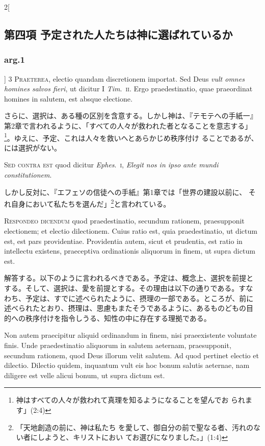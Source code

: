\documentclass[paper=a4paper,fontsize=10pt,jafontsize=9pt,titlepage]{jlreq}
\begin{document}
\begin{paracol}{2}[\subsection{第四項 予定された人たちは神に選ばれているか}\subsubsection{arg.1}]
{\scshape 3 Praeterea}, electio quandam discretionem
 importat. Sed Deus {\itshape vult omnes homines salvos fieri}, ut dicitur I
 {\itshape Tim}.~{\scshape ii}. Ergo praedestinatio, quae praeordinat homines in salutem, est
 absque electione.


\switchcolumn


さらに、選択は、ある種の区別を含意する。しかし神は、『テモテへの手紙一』
第2章で言われるように、「すべての人々が救われた者となることを意志する」
\footnote{神はすべての人々が救われて真理を知るようになることを望んでお
られます」(2:4)}。ゆえに、予定、これは人々を救いへとあらかじめ秩序付け
ることであるが、には選択がない。


\switchcolumn*[\subsubsection{s.c.}]


{\scshape Sed contra est} quod dicitur {\itshape Ephes}.~{\scshape i}, {\itshape Elegit
 nos in ipso ante mundi constitutionem}.


\switchcolumn


しかし反対に、『エフェソの信徒への手紙』第1章では「世界の建設以前に、
それ自身において私たちを選んだ」\footnote{「天地創造の前に、神は私たち
を愛して、御自分の前で聖なる者、汚れのない者にしようと、キリストにおい
てお選びになりました。」(1:4)}と言われている。




{\scshape Respondeo dicendum} quod praedestinatio,
 secundum rationem, praesupponit electionem; et electio
 dilectionem. Cuius ratio est, quia praedestinatio, ut dictum est, est
 pars providentiae. Providentia autem, sicut et prudentia, est ratio in
 intellectu existens, praeceptiva ordinationis aliquorum in finem, ut
 supra dictum est.


\switchcolumn


解答する。以下のように言われるべきである。予定は、概念上、選択を前提と
する。そして、選択は、愛を前提とする。その理由は以下の通りである。すな
わち、予定は、すでに述べられたように、摂理の一部である。ところが、前に
述べられたとおり、摂理は、思慮もまたそうであるように、あるものどもの目
的への秩序付けを指令しうる、知性の中に存在する理拠である。


\switchcolumn*


Non autem praecipitur aliquid ordinandum in finem,
 nisi praeexistente voluntate finis. Unde praedestinatio aliquorum in
 salutem aeternam, praesupponit, secundum rationem, quod Deus illorum
 velit salutem. Ad quod pertinet electio et dilectio. Dilectio quidem,
 inquantum vult eis hoc bonum salutis aeternae, nam diligere est velle
 alicui bonum, ut supra dictum est.



\end{paracol}
\end{document}
